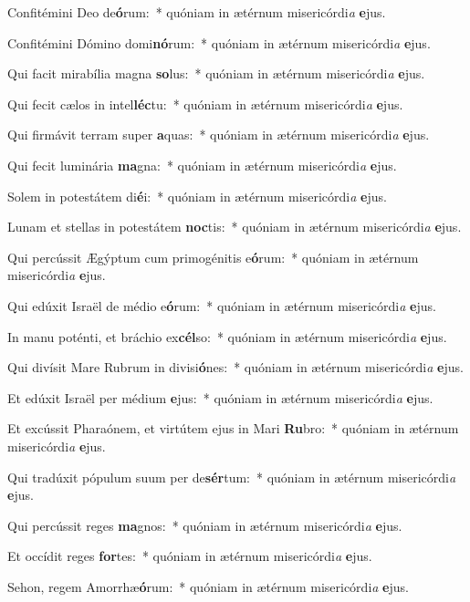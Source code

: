 \item Confitémini Deo de\textbf{ó}rum:~* quóniam in ætérnum misericórdi\textit{a} \textbf{e}jus.
\item Confitémini Dómino domi\textbf{nó}rum:~* quóniam in ætérnum misericórdi\textit{a} \textbf{e}jus.
\item Qui facit mirabília magna \textbf{so}lus:~* quóniam in ætérnum misericórdi\textit{a} \textbf{e}jus.
\item Qui fecit cælos in intel\textbf{léc}tu:~* quóniam in ætérnum misericórdi\textit{a} \textbf{e}jus.
\item Qui firmávit terram super \textbf{a}quas:~* quóniam in ætérnum misericórdi\textit{a} \textbf{e}jus.
\item Qui fecit luminária \textbf{ma}gna:~* quóniam in ætérnum misericórdi\textit{a} \textbf{e}jus.
\item Solem in potestátem di\textbf{é}i:~* quóniam in ætérnum misericórdi\textit{a} \textbf{e}jus.
\item Lunam et stellas in potestátem \textbf{noc}tis:~* quóniam in ætérnum misericórdi\textit{a} \textbf{e}jus.
\item Qui percússit Ægýptum cum primogénitis e\textbf{ó}rum:~* quóniam in ætérnum misericórdi\textit{a} \textbf{e}jus.
\item Qui edúxit Israël de médio e\textbf{ó}rum:~* quóniam in ætérnum misericórdi\textit{a} \textbf{e}jus.
\item In manu poténti, et bráchio ex\textbf{cél}so:~* quóniam in ætérnum misericórdi\textit{a} \textbf{e}jus.
\item Qui divísit Mare Rubrum in divisi\textbf{ó}nes:~* quóniam in ætérnum misericórdi\textit{a} \textbf{e}jus.
\item Et edúxit Israël per médium \textbf{e}jus:~* quóniam in ætérnum misericórdi\textit{a} \textbf{e}jus.
\item Et excússit Pharaónem, et virtútem ejus in Mari \textbf{Ru}bro:~* quóniam in ætérnum misericórdi\textit{a} \textbf{e}jus.
\item Qui tradúxit pópulum suum per de\textbf{sér}tum:~* quóniam in ætérnum misericórdi\textit{a} \textbf{e}jus.
\item Qui percússit reges \textbf{ma}gnos:~* quóniam in ætérnum misericórdi\textit{a} \textbf{e}jus.
\item Et occídit reges \textbf{for}tes:~* quóniam in ætérnum misericórdi\textit{a} \textbf{e}jus.
\item Sehon, regem Amorrhæ\textbf{ó}rum:~* quóniam in ætérnum misericórdi\textit{a} \textbf{e}jus.
